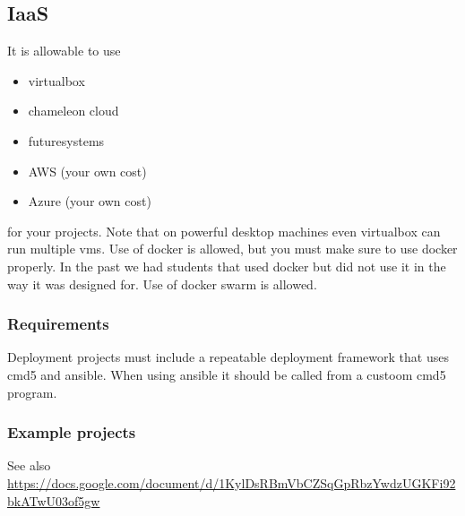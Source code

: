 \subsection{IaaS}\label{iaas}

It is allowable to use

\begin{itemize}
\tightlist
\item
  virtualbox
\item
  chameleon cloud
\item
  futuresystems
\item
  AWS (your own cost)
\item
  Azure (your own cost)
\end{itemize}

for your projects. Note that on powerful desktop machines even
virtualbox can run multiple vms. Use of docker is allowed, but you must
make sure to use docker properly. In the past we had students that used
docker but did not use it in the way it was designed for. Use of docker
swarm is allowed.

\subsubsection{Requirements}\label{requirements}

Deployment projects must include a repeatable deployment framework that
uses cmd5 and ansible. When using ansible it should be called from a
custoom cmd5 program.

\subsubsection{Example projects}\label{example-projects}

See also
\url{https://docs.google.com/document/d/1KylDsRBmVbCZSqGpRbzYwdzUGKFi92bkATwU03of5gw}


